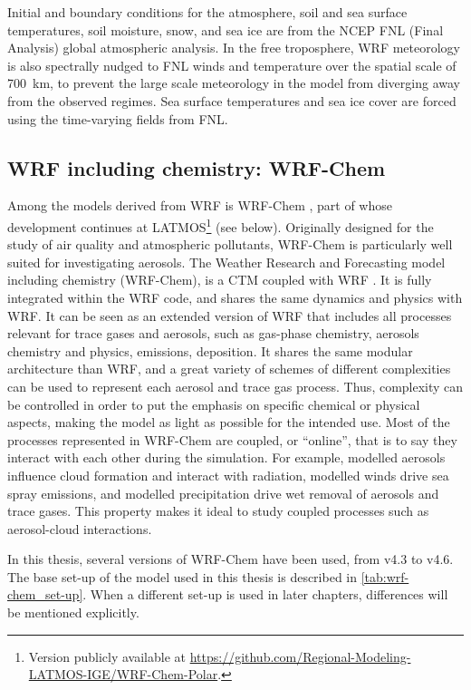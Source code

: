     Initial and boundary conditions for the atmosphere, soil and sea surface temperatures, soil moisture, snow, and sea ice are from the NCEP FNL (Final Analysis) global atmospheric analysis. In the free troposphere, WRF meteorology is also spectrally nudged to FNL winds and temperature over the spatial scale of \SI{700}{km}, to prevent the large scale meteorology in the model from diverging away from the observed regimes.
    Sea surface temperatures and sea ice cover are forced using the time-varying fields from FNL.

    \subsection{WRF including chemistry: WRF-Chem}
    \label{sec:wrfchem}
    Among the models derived from WRF is WRF-Chem \citep[WRF including chemistry;][]{grell_fully_2005}, part of whose development continues at LATMOS\footnote{Version publicly available at \url{https://github.com/Regional-Modeling-LATMOS-IGE/WRF-Chem-Polar}.} (see below). Originally designed for the study of air quality and atmospheric pollutants, WRF-Chem is particularly well suited for investigating aerosols.
    The Weather Research and Forecasting model including chemistry (WRF-Chem), is a CTM coupled with WRF \citep{grell_fully_2005}. It is fully integrated within the WRF code, and shares the same dynamics and physics with WRF.
    It can be seen as an extended version of WRF that includes all processes relevant for trace gases and aerosols, such as gas-phase chemistry, aerosols chemistry and physics, emissions, deposition. It shares the same modular architecture than WRF, and a great variety of schemes of different complexities can be used to represent each aerosol and trace gas process. Thus, complexity can be controlled in order to put the emphasis on specific chemical or physical aspects, making the model as light as possible for the intended use.
    Most of the processes represented in WRF-Chem are coupled, or ``online'', that is to say they interact with each other during the simulation. For example, modelled aerosols influence cloud formation and interact with radiation, modelled winds drive sea spray emissions, and modelled precipitation drive wet removal of aerosols and trace gases.
    This property makes it ideal to study coupled processes such as aerosol-cloud interactions.

    In this thesis, several versions of WRF-Chem have been used, from v4.3 to v4.6. The base set-up of the model used in this thesis is described in \cref{tab:wrf-chem_set-up}. When a different set-up is used in later chapters, differences will be mentioned explicitly.

